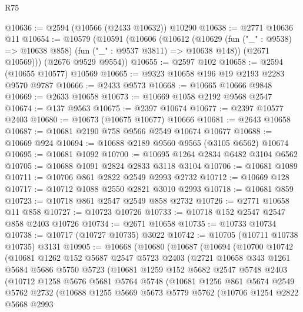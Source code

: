 \begin{lexlean}{R75}
\begin{coremodule}
@10636 := @2594 (@10566 (@2433 @10632)) @10290
@10638 := @2771 @10636 @11
@10654 := @10579
    (@10591
      (@10606
        (@10612
          (@10629 (fun ("_" : @9538) => @10638 @858) (fun ("_" : @9537 @3811) => @10638 @148))
          (@2671 @10569)))
      (@2676 @9529 @9554))
@10655 := @2597 @102
@10658 := @2594 (@10655 @10577) @10569
@10665 := @9323 @10658 @196 @19 @2193 @2283 @9570 @9787
@10666 := @2433 @9573
@10668 := @10665 @10666 @9848
@10669 := @2633 @10658
@10673 := @10669 @1058 @2192 @9568 @2547
@10674 := @137 @9563
@10675 := @2397 @10674
@10677 := @2397 @10577 @2403
@10680 := @10673 (@10675 @10677) @10666
@10681 := @2643 @10658
@10687 := @10681 @2190 @758 @9566 @2549 @10674 @10677
@10688 := @10669 @924
@10694 := @10688 @2189 @9560 @9565 (@3105 @6562) @10674
@10695 := @10681 @1092
@10700 := @10695 @1264 @2834 @6482 @3104 @6562
@10705 := @10688 @1091 @2824 @2833 @3118 @3104
@10706 := @10681 @1089
@10711 := @10706 @861 @2822 @2549 @2993 @2732
@10712 := @10669 @128
@10717 := @10712 @1088 @2550 @2821 @3010 @2993
@10718 := @10681 @859
@10723 := @10718 @861 @2547 @2549 @858 @2732
@10726 := @2771 @10658 @11 @858
@10727 := @10723 @10726
@10733 := @10718 @152 @2547 @2547 @858 @2403 @10726
@10734 := @2671 @10658
@10735 := @10733 @10734
@10738 := @10717 (@10727 @10735) @3022
@10742 := @10705 (@10711 @10738 @10735) @3131
@10905 := @10668
    (@10680
      (@10687
        (@10694
          (@10700
            @10742
            (@10681
              @1262
              @152
              @5687
              @2547
              @5723
              @2403
              (@2721
                @10658
                @343
                @1261
                @5684
                @5686
                @5750
                @5723
                (@10681
                  @1259
                  @152
                  @5682
                  @2547
                  @5748
                  @2403
                  (@10712
                    @1258
                    @5676
                    @5681
                    @5764
                    @5748
                    (@10681
                      @1256
                      @861
                      @5674
                      @2549
                      @5762
                      @2732
                      (@10688
                        @1255
                        @5669
                        @5673
                        @5779
                        @5762
                        (@10706
                          @1254
                          @2822
                          @5668
                          @2993

\end{coremodule}
\end{lexlean}

